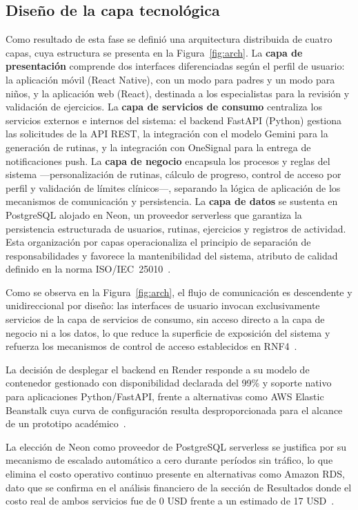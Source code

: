 			\subsection{Diseño de la capa tecnológica}
				Como resultado de esta fase se definió una arquitectura distribuida de cuatro capas, cuya estructura se presenta en la Figura~\ref{fig:arch}. La \textbf{capa de presentación} comprende dos interfaces diferenciadas según el perfil de usuario: la aplicación móvil (React Native), con un modo para padres y un modo para niños, y la aplicación web (React), destinada a los especialistas para la revisión y validación de ejercicios. La \textbf{capa de servicios de consumo} centraliza los servicios externos e internos del sistema: el backend FastAPI (Python) gestiona las solicitudes de la API REST, la integración con el modelo Gemini para la generación de rutinas, y la integración con OneSignal para la entrega de notificaciones push. La \textbf{capa de negocio} encapsula los procesos y reglas del sistema ---personalización de rutinas, cálculo de progreso, control de acceso por perfil y validación de límites clínicos---, separando la lógica de aplicación de los mecanismos de comunicación y persistencia. La \textbf{capa de datos} se sustenta en PostgreSQL alojado en Neon, un proveedor serverless que garantiza la persistencia estructurada de usuarios, rutinas, ejercicios y registros de actividad. Esta organización por capas operacionaliza el principio de separación de responsabilidades y favorece la mantenibilidad del sistema, atributo de calidad definido en la norma ISO/IEC~25010~\cite{Fowler2002,GuerreroUlloa2024}.
				
				Como se observa en la Figura~\ref{fig:arch}, el flujo de comunicación es descendente y unidireccional por diseño: las interfaces de usuario invocan exclusivamente servicios de la capa de servicios de consumo, sin acceso directo a la capa de negocio ni a los datos, lo que reduce la superficie de exposición del sistema y refuerza los mecanismos de control de acceso establecidos en RNF4~\cite{Kleppmann2017,LOPDP2021}.
				
				La decisión de desplegar el backend en Render responde a su modelo de contenedor gestionado con disponibilidad declarada del 99\% y soporte nativo para aplicaciones Python/FastAPI, frente a alternativas como AWS Elastic Beanstalk cuya curva de configuración resulta desproporcionada para el alcance de un prototipo académico~\cite{Kleppmann2017}.
				
				La elección de Neon como proveedor de PostgreSQL serverless se justifica por su mecanismo de escalado automático a cero durante períodos sin tráfico, lo que elimina el costo operativo continuo presente en alternativas como Amazon RDS, dato que se confirma en el análisis financiero de la sección de Resultados donde el costo real de ambos servicios fue de 0 USD frente a un estimado de 17 USD~\cite{Kleppmann2017}.
				
